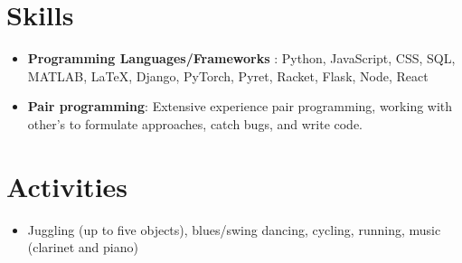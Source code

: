 \documentclass[letterpaper,11pt]{article}
\newcommand{\resumeSubHeadingListStart}{\begin{itemize}[leftmargin=*]}
\newcommand{\resumeSubHeadingListEnd}{\end{itemize}}
\begin{document}
\section{Skills}
  \resumeSubHeadingListStart
    \item \textbf{Programming Languages/Frameworks} : Python, JavaScript, CSS, SQL, MATLAB, \LaTeX, Django, PyTorch, Pyret, Racket, Flask, Node, React
    \item \textbf{Pair programming}: Extensive experience pair programming, working with other's to formulate approaches, catch bugs, and write code.
  \resumeSubHeadingListEnd
\section{Activities}
    \resumeSubHeadingListStart
    \item Juggling (up to five objects), blues/swing dancing, cycling, running, music (clarinet and piano)
  \resumeSubHeadingListEnd
\end{document}
